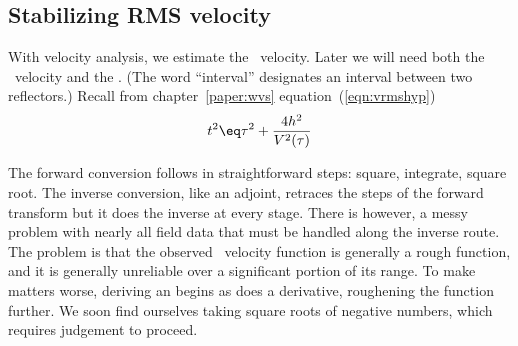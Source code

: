 \subsection{Stabilizing RMS velocity}
\par
{}
With velocity analysis, we estimate the \RMS\ velocity.
Later we will need both the \RMS\ velocity and the .
(The word ``interval'' designates an interval between two reflectors.)
Recall from chapter~\ref{paper:wvs} equation~(\ref{eqn:vrmshyp})
$$
t^2 \eq \tau^2 + \frac{4h^2}{V^2(\tau)}  \nonumber
$$
\par
The forward conversion follows 
in straightforward steps: square, integrate, square root.
The inverse conversion, like an adjoint,
retraces the steps of the forward transform
but it does the inverse at every stage.
There is however,
a messy problem with nearly all field data
that must be handled along the inverse route.
The problem is that the observed \RMS\ velocity function
is generally a rough function,
and it is generally unreliable over a significant portion of its range.
To make matters worse,
deriving an  begins as does a derivative,
roughening the function further.
We soon find ourselves taking square roots of negative numbers,
which requires judgement to proceed.
\begin{comment}
The technique used in \texttt{vint2rms()} \vpageref{lst:vint2rms}
is to average the squared interval velocity
in ever expanding neighborhoods until there are no longer
any negative squared interval velocities.
As long as we are restricting $v^2$ from being negative,
it is easy to restrict it to be above some allowable velocity,
say {\tt vminallow}.
Figures~\ref{fig:rufsmo} and~\ref{fig:vrmsint}
were derived from the velocity scans in Figure~\ref{fig:slowfit}. %
\activeplot{rufsmo}{width=5.00in,height=2.5in}{ER}{
	Left is the raw \RMS\ velocity.
	Right is a superposition of \RMS\ velocities,
	the raw one,
	and one constrained to have realistic interval velocities.
	}%
Figure~\ref{fig:rufsmo} shows the \RMS\ velocity before and after
a trip backward and forward through routine~\texttt{vint2rms()} \vpageref{lst:vint2rms}.
The interval velocity associated with the smoothed velocity
is in figure~\ref{fig:vrmsint}.
	

\activesideplot{vrmsint}{width=2.50in,height=2.5in}{ER}{
	Interval velocity associated with the smoothed
	\RMS\ velocity of Figure~\protect\ref{fig:rufsmo}.
	Pushbutton allows experimentation with {\tt vminallow}.
	}
\end{comment}
